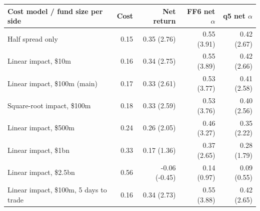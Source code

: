 \begin{tabular}{lrrrr}
\toprule
Cost model / fund size per side & Cost & Net return & FF6 net $\alpha$ & q5 net $\alpha$ \\
\midrule
Half spread only & 0.15 & 0.35 (2.76) & 0.55 (3.91) & 0.42 (2.67) \\
Linear impact, \$10m & 0.16 & 0.34 (2.75) & 0.55 (3.89) & 0.42 (2.66) \\
Linear impact, \$100m (main) & 0.17 & 0.33 (2.61) & 0.53 (3.77) & 0.41 (2.58) \\
Square-root impact, \$100m & 0.18 & 0.33 (2.59) & 0.53 (3.76) & 0.40 (2.56) \\
Linear impact, \$500m & 0.24 & 0.26 (2.05) & 0.46 (3.27) & 0.35 (2.22) \\
Linear impact, \$1bn & 0.33 & 0.17 (1.36) & 0.37 (2.65) & 0.28 (1.79) \\
Linear impact, \$2.5bn & 0.56 & -0.06 (-0.45) & 0.14 (0.97) & 0.09 (0.55) \\
Linear impact, \$100m, 5 days to trade & 0.16 & 0.34 (2.73) & 0.55 (3.88) & 0.42 (2.65) \\
\bottomrule
\end{tabular}
